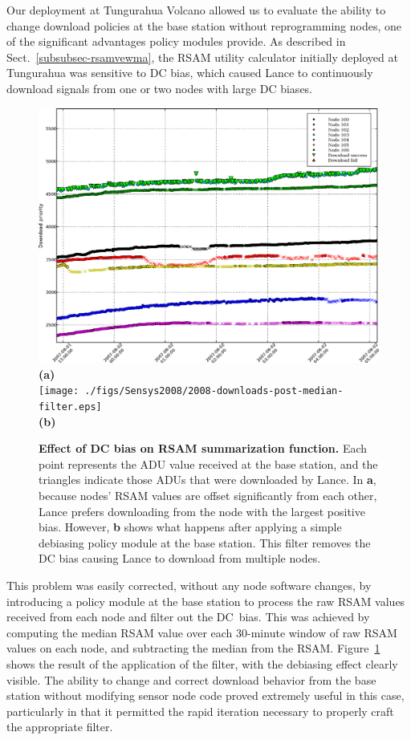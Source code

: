 Our deployment at Tungurahua Volcano allowed us to evaluate the ability to
change download policies at the base station without reprogramming nodes, one
of the significant advantages policy modules provide.  As described in
Sect.~\ref{subsubsec-rsamvewma}, the RSAM utility calculator initially
deployed at Tungurahua was sensitive to DC bias, which caused Lance to
continuously download signals from one or two nodes with large DC biases.

\begin{figure}[t!]
\begin{center}
\includegraphics[width=0.7\hsize]{./figs/Sensys2008/2008-downloads-pre-median-filter.eps}\\
\textbf{(a)}\\
\texttt{[image: ./figs/Sensys2008/2008-downloads-post-median-filter.eps]}\\
\textbf{(b)}
\end{center}
\caption{{\bf Effect of DC bias on RSAM summarization function.}
Each point represents the ADU value received at the base station, and the
triangles indicate those ADUs that were downloaded by Lance. In \textbf{a},
because nodes' RSAM values are offset significantly from each other, Lance
prefers downloading from the node with the largest positive bias. However,
\textbf{b} shows what happens after applying a simple debiasing policy module
at the base station. This filter removes the DC bias causing Lance to
download from multiple nodes.}
\label{fig-downloads-median-filter}
\end{figure}

This problem was easily corrected, without any node software changes, by
introducing a policy module at the base station to process the raw RSAM
values received from each node and filter out the DC~bias. This was achieved
by computing the median RSAM value over each 30-minute window of raw RSAM
values on each node, and subtracting the median from the RSAM.
Figure~\ref{fig-downloads-median-filter} shows the result of the application
of the filter, with the debiasing effect clearly visible. The ability to
change and correct download behavior from the base station without modifying
sensor node code proved extremely useful in this case, particularly in that
it permitted the rapid iteration necessary to properly craft the appropriate
filter.
